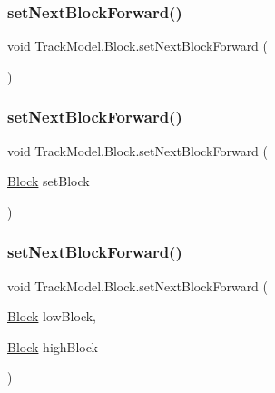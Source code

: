 \subsubsection{\texorpdfstring{set\+Next\+Block\+Forward()}{setNextBlockForward()}\hspace{0.1cm}{\footnotesize\ttfamily [1/3]}}
{\footnotesize\ttfamily void Track\+Model.\+Block.\+set\+Next\+Block\+Forward (\begin{DoxyParamCaption}{ }\end{DoxyParamCaption})}

\mbox{\label{classTrackModel_1_1Block_a01715a2edb54f2a6791f95e81e613f2b}} 
\subsubsection{\texorpdfstring{set\+Next\+Block\+Forward()}{setNextBlockForward()}\hspace{0.1cm}{\footnotesize\ttfamily [2/3]}}
{\footnotesize\ttfamily void Track\+Model.\+Block.\+set\+Next\+Block\+Forward (\begin{DoxyParamCaption}\item[{\hyperlink{classTrackModel_1_1Block}{Block}}]{set\+Block }\end{DoxyParamCaption})}

\mbox{\label{classTrackModel_1_1Block_a737780636e43298572855b15fc3b20d5}} 
\subsubsection{\texorpdfstring{set\+Next\+Block\+Forward()}{setNextBlockForward()}\hspace{0.1cm}{\footnotesize\ttfamily [3/3]}}
{\footnotesize\ttfamily void Track\+Model.\+Block.\+set\+Next\+Block\+Forward (\begin{DoxyParamCaption}\item[{\hyperlink{classTrackModel_1_1Block}{Block}}]{low\+Block,  }\item[{\hyperlink{classTrackModel_1_1Block}{Block}}]{high\+Block }\end{DoxyParamCaption})}



